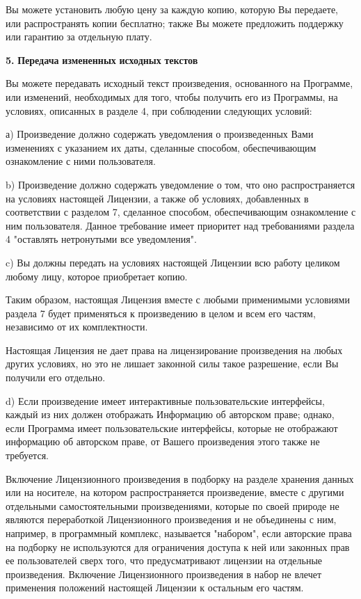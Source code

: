Вы можете установить любую цену за каждую копию, которую Вы передаете, или распространять копии бесплатно; также Вы можете предложить поддержку или гарантию за отдельную плату.

{\bfseries{5.}} {\bfseries{Передача}} {\bfseries{измененных}} {\bfseries{исходных}} {\bfseries{текстов}}

Вы можете передавать исходный текст произведения, основанного на Программе, или изменений, необходимых для того, чтобы получить его из Программы, на условиях, описанных в разделе 4, при соблюдении следующих условий\+:

а) Произведение должно содержать уведомления о произведенных Вами изменениях с указанием их даты, сделанные способом, обеспечивающим ознакомление с ними пользователя.

b) Произведение должно содержать уведомление о том, что оно распространяется на условиях настоящей Лицензии, а также об условиях, добавленных в соответствии с разделом 7, сделанное способом, обеспечивающим ознакомление с ним пользователя. Данное требование имеет приоритет над требованиями раздела 4 "{}оставлять нетронутыми все уведомления"{}.

c) Вы должны передать на условиях настоящей Лицензии всю работу целиком любому лицу, которое приобретает копию.

Таким образом, настоящая Лицензия вместе с любыми применимыми условиями раздела 7 будет применяться к произведению в целом и всем его частям, независимо от их комплектности.

Настоящая Лицензия не дает права на лицензирование произведения на любых других условиях, но это не лишает законной силы такое разрешение, если Вы получили его отдельно.

d) Если произведение имеет интерактивные пользовательские интерфейсы, каждый из них должен отображать Информацию об авторском праве; однако, если Программа имеет пользовательские интерфейсы, которые не отображают информацию об авторском праве, от Вашего произведения этого также не требуется.

Включение Лицензионного произведения в подборку на разделе хранения данных или на носителе, на котором распространяется произведение, вместе с другими отдельными самостоятельными произведениями, которые по своей природе не являются переработкой Лицензионного произведения и не объединены с ним, например, в программный комплекс, называется "{}набором"{}, если авторские права на подборку не используются для ограничения доступа к ней или законных прав ее пользователей сверх того, что предусматривают лицензии на отдельные произведения. Включение Лицензионного произведения в набор не влечет применения положений настоящей Лицензии к остальным его частям.

